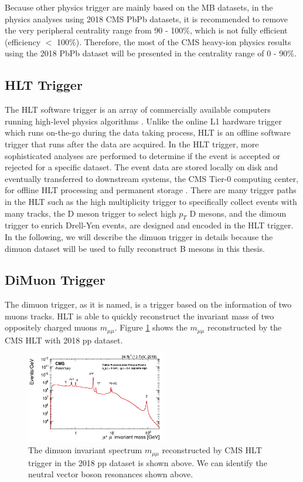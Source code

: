 Because other physics trigger are mainly based on the MB datasets, in the physics analyses using 2018 CMS PbPb datasets, it is recommended to remove the very peripheral centrality range from 90 - 100\%, which is not fully efficient (efficiency $<$ 100\%). Therefore, the most of the CMS heavy-ion physics results using the 2018 PbPb dataset will be presented in the centrality range of 0 - 90\%.

\subsection{HLT Trigger}

The HLT software trigger is an array of commercially available computers running high-level physics algorithms \cite{CMSTrigger}. Unlike the online L1 hardware trigger which runs on-the-go during the data taking process, HLT is an offline software trigger that runs after the data are acquired. In the HLT trigger, more sophisticated analyses are performed to determine if the event is accepted or rejected for a specific dataset. The event data are stored locally on disk and eventually transferred to downstream systems, the CMS Tier-0 computing center, for offline HLT processing and permanent storage \cite{CMSTrigger}. There are many trigger paths in the HLT such as the high multiplicity trigger to specifically collect events with many tracks, the D meson trigger to select high $p_T$ D mesons, and the dimoun trigger to enrich Drell-Yen events, are designed and encoded in the HLT trigger. In the following, we will describe the dimuon trigger in details because the dimuon dataset will be used to fully reconstruct B mesons in this thesis. 

\subsection{DiMuon Trigger}

The dimuon trigger, as it is named, is a trigger based on the information of two muons tracks. HLT is able to quickly reconstruct the invariant mass of two oppositely charged muons $m_{\mu\mu}$. Figure \ref{DimuonInvMass} shows the $m_{\mu\mu}$ reconstructed by the CMS HLT with 2018 pp dataset.

\begin{figure}[hbtp]
\begin{center}
\includegraphics[width=0.55\textwidth]{Figures/Chapter2/DimuonInvMass.png}
\caption{The dimuon invariant spectrum $m_{\mu\mu}$ reconstructed by CMS HLT trigger in the 2018 pp dataset is shown above. We can identify the neutral vector boson resonances shown above.}
\label{DimuonInvMass}
\end{center}
\end{figure} 



